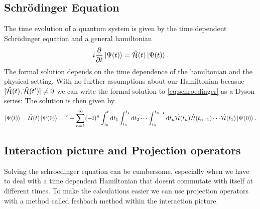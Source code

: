 \subsection{Schrödinger Equation}
The time evolution of a quantum system is given by the time dependent Schrödinger equation and a general hamiltonian
\begin{equation}
    i \frac{\partial}{\partial t} \ket{\Psi(t)} = \hat{\mathcal{H}}(t) \ket{\Psi(t)}. \label{eq:schroedinger}
\end{equation}
The formal solution depends on the time dependence of the hamiltonian and the physical setting. 
With no further assumptions about our Hamiltonian becasue $[\hat{\mathcal{H}}(t), \hat{\mathcal{H}}(t')] \neq 0$ we can write the formal solution to \eqref{eq:schroedinger} as a Dyson series:
The solution is then given by 
\begin{equation}
    \ket{\Psi(t)} = \hat{\mathcal{U}}(t)\ket{\Psi(0)} = \hat{1} + \sum_{n=1}^{\infty} (-i)^n \int_{t_0}^{t} \mathrm{d} t_1 \int_{t_0}^{t_1} \mathrm{d} t_2 \cdots \int_{t_0}^{t_{n-1}} \mathrm{d} t_n \hat{\mathcal{H}}(t_n) \hat{\mathcal{H}}(t_{n-1})\cdots\hat{\mathcal{H}}(t_1) \ket{\Psi(0)}. \label{eq:dyson}
\end{equation}
\subsection{Interaction picture and Projection operators}
Solving the schroedinger equation can be cumbersome, especially when we have to deal with a time dependent Hamiltonian that doesnt commutate with itself at different times.
To make the calculations easier we can use projection operators with a method called feshbach method within the interaction picture.




